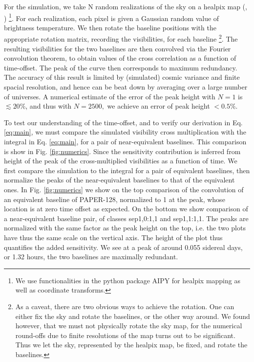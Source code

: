 \documentclass[preprint2,numberedappendix,tighten,twocolappendix]{aastex6}  %
\renewcommand\[{\begin{equation}}
\renewcommand\]{\end{equation}}
\begin{document}
For the simulation, we take N random realizations of the sky
on a healpix map (\cite{Heal}, \cite{HealPrimer}) \footnote{We use functionalities in the python package AIPY for healpix mapping
as well as coordinate transforms. }. For each realization, each pixel is given a Gaussian random value
of brightness temperature. We then rotate the baseline positions with
the appropriate rotation matrix, recording the visibilities, for each
baseline \footnote{As a caveat, there are two obvious ways to achieve the rotation. One
can either fix the sky and rotate the baselines, or the other way
around. We found however, that we must not physically rotate the sky
map, for the numerical round-offs due to finite resolutions of the
map turns out to be significant. Thus we let the sky, represented
by the healpix map, be fixed, and rotate the baselines. }. The resulting visibilities for the two baselines are then convolved
via the Fourier convolution theorem, to obtain values of the cross
correlation as a function of time-offset. The peak of the curve then
corresponds to maximum redundancy. The accuracy of this result is
limited by (simulated) cosmic variance and finite spacial resolution,
and hence can be beat down by averaging over a large number of universes.
A numerical estimate of the error of the peak height with $N=1$ is
$\lesssim20\%$, and thus with $N=2500,$ we achieve an error of peak
height $<0.5\%$. 

To test our understanding of the time-offset, and to verify our derivation
in Eq. \eqref{eq:main}, we must compare the simulated visibility cross multiplication with the integral in
Eq. \eqref{eq:main}, for a pair of near-equivalent baselines. 
This comparison is show in Fig. \ref{fig:numerics}. 
Since the sensitivity contribution is inferred from height of the peak of the cross-multiplied visibilities as a function of time. 
We first compare the simulation to the integral for a pair of equivalent baselines, then normalize the peaks 
of the near-equivalent baselines to that of the equivalent ones. 
In Fig. \ref{fig:numerics}  we show on the top comparison of
the convolution of an equivalent baseline of PAPER-128, normalized to 1 at the
peak, whose location is at zero time offset as expected. On the bottom we show
comparison of a near-equivalent baseline pair, of classes sep1,0:1,1 and sep1,1:1,1. The peaks
are normalized with the same factor as the peak height on the top,
i.e. the two plots have thus the same scale on the vertical axis.
The height of the plot thus quantifies the added sensitivity. We see at a peak of around 0.055 sidereal days, or 1.32 hours, the two baselines are maximally redundant. 
\end{document}
